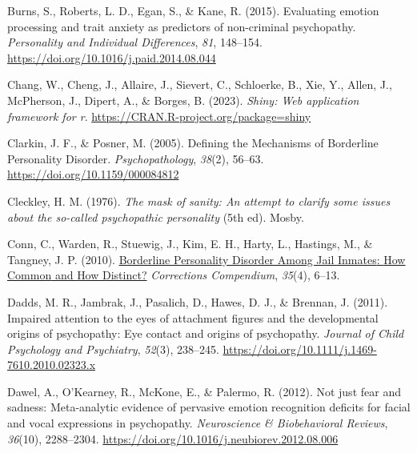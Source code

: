 \documentclass[
  man,floatsintext]{apa7}
\newlength{\cslhangindent}
\newlength{\cslentryspacingunit} %
\newenvironment{CSLReferences}[2] %
 {%
  \setlength{\parindent}{0pt}
  \ifodd #1
  \let\oldpar\par
  \def\par{\hangindent=\cslhangindent\oldpar}
  \fi
  \setlength{\parskip}{#2\cslentryspacingunit}
 }%
 {}
\begin{document}
\begin{CSLReferences}{1}{0}
\leavevmode{}%
Burns, S., Roberts, L. D., Egan, S., \& Kane, R. (2015). Evaluating emotion processing and trait anxiety as predictors of non-criminal psychopathy. \emph{Personality and Individual Differences}, \emph{81}, 148--154. \url{https://doi.org/10.1016/j.paid.2014.08.044}

\leavevmode{}%
Chang, W., Cheng, J., Allaire, J., Sievert, C., Schloerke, B., Xie, Y., Allen, J., McPherson, J., Dipert, A., \& Borges, B. (2023). \emph{Shiny: Web application framework for r}. \url{https://CRAN.R-project.org/package=shiny}

\leavevmode{}%
Clarkin, J. F., \& Posner, M. (2005). Defining the {Mechanisms} of {Borderline Personality Disorder}. \emph{Psychopathology}, \emph{38}(2), 56--63. \url{https://doi.org/10.1159/000084812}

\leavevmode{}%
Cleckley, H. M. (1976). \emph{The mask of sanity: An attempt to clarify some issues about the so-called psychopathic personality} (5th ed). {Mosby}.

\leavevmode{}%
Conn, C., Warden, R., Stuewig, J., Kim, E. H., Harty, L., Hastings, M., \& Tangney, J. P. (2010). \href{https://www.ncbi.nlm.nih.gov/pmc/articles/PMC4825675}{Borderline {Personality Disorder Among Jail Inmates}: {How Common} and {How Distinct}?} \emph{Corrections Compendium}, \emph{35}(4), 6--13.

\leavevmode{}%
Dadds, M. R., Jambrak, J., Pasalich, D., Hawes, D. J., \& Brennan, J. (2011). Impaired attention to the eyes of attachment figures and the developmental origins of psychopathy: {Eye} contact and origins of psychopathy. \emph{Journal of Child Psychology and Psychiatry}, \emph{52}(3), 238--245. \url{https://doi.org/10.1111/j.1469-7610.2010.02323.x}

\leavevmode{}%
Dawel, A., O'Kearney, R., McKone, E., \& Palermo, R. (2012). Not just fear and sadness: {Meta-analytic} evidence of pervasive emotion recognition deficits for facial and vocal expressions in psychopathy. \emph{Neuroscience \& Biobehavioral Reviews}, \emph{36}(10), 2288--2304. \url{https://doi.org/10.1016/j.neubiorev.2012.08.006}


\end{CSLReferences}
\end{document}
